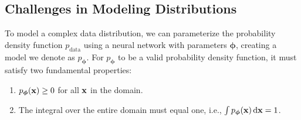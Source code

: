 \subsection{Challenges in Modeling Distributions}





To model a complex data distribution, we can parameterize the probability density function $p_{\mathrm{data}}$ using a neural network with parameters $\bm{\phi}$, creating a model we denote as $p_{\bm{\phi}}$. For $p_{\bm{\phi}}$ to be a valid probability density function, it must satisfy two fundamental properties:
\begin{enumerate}
    \item[(i)]  $p_{\bm{\phi}}({\mathbf{x}}) \ge 0$ for all ${\mathbf{x}}$ in the domain.
    \item[(ii)]  The integral over the entire domain must equal one, i.e., $\int p_{\bm{\phi}}({\mathbf{x}}) \mathop{}\!\mathrm{d} {\mathbf{x}} = 1$.
\end{enumerate}

